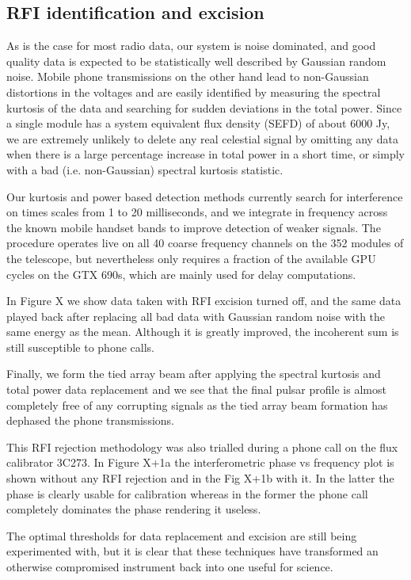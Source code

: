 \subsection{RFI identification and excision}

As is the case for most radio data, our system is noise dominated, and good quality data is expected to be statistically well described by Gaussian random noise. Mobile phone transmissions on the other hand lead to non-Gaussian distortions in the voltages and are easily identified by measuring the spectral kurtosis of the data and searching for sudden deviations in the total power. Since a single module has a system equivalent flux density (SEFD) of about 6000 Jy, we are extremely unlikely to delete any real celestial signal by omitting any data when there is a large percentage increase in total power in a short time, or simply with a bad (i.e. non-Gaussian) spectral kurtosis statistic. 

Our kurtosis and power based detection methods currently search for interference on times scales from 1 to 20 milliseconds, and we integrate in frequency across the known mobile handset bands to improve detection of weaker signals. The procedure operates live on all 40 coarse frequency channels on the 352 modules of the telescope, but nevertheless only requires a fraction of the available GPU cycles on the GTX 690s, which are mainly used for delay computations. 

In Figure X we show data taken with RFI excision turned off, and the same data played back after replacing all bad data with Gaussian random noise with the same energy as the mean. Although it is greatly improved, the incoherent sum is still susceptible to phone calls.

Finally, we form the tied array beam after applying the spectral kurtosis and total power data replacement and we see that the final pulsar profile is almost completely free of any corrupting signals as the tied array beam formation has dephased the phone transmissions.

This RFI rejection methodology was also trialled during a phone call on the flux calibrator 3C273. In Figure X+1a the interferometric phase vs frequency plot is shown without any RFI rejection and in the Fig X+1b with it. In the latter the phase is clearly usable for calibration whereas in the former the phone call completely dominates the phase rendering it useless.

The optimal thresholds for data replacement and excision are still being experimented with, but it is clear that these techniques have transformed an otherwise compromised instrument back into one useful for science.

